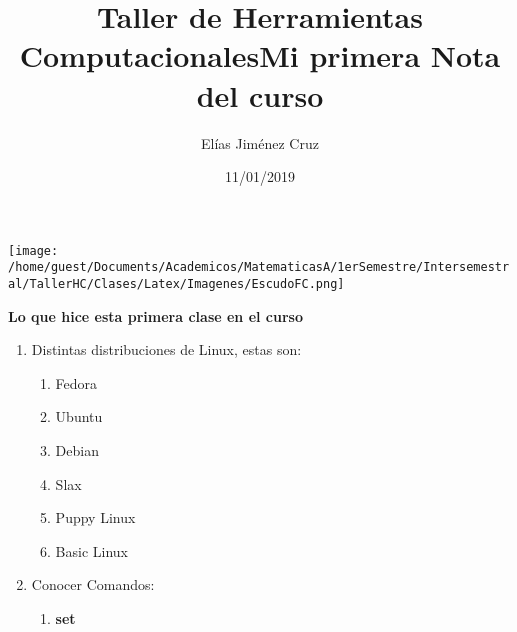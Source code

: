 \documentclass[letterpaper, 12pt, oneside]{article} %
\title{\Huge Taller de Herramientas Computacionales}
\author{Elías Jiménez Cruz}
\date{11/01/2019}
\begin{document}
	\maketitle
	\begin{center}
		\texttt{[image: /home/guest/Documents/Academicos/MatematicasA/1erSemestre/Intersemestral/TallerHC/Clases/Latex/Imagenes/EscudoFC.png]}
	\end{center}
	\newpage
	\title{\Huge Mi primera Nota del curso\\}
	\textbf{Lo que hice esta primera clase en el curso}
	\begin{enumerate}
		\item Distintas distribuciones de Linux, estas son:
		\begin{enumerate}
			\item Fedora
			\item Ubuntu
			\item Debian
			\item Slax
			\item Puppy Linux
			\item Basic Linux
		\end{enumerate}
		\item Conocer Comandos:
		\begin{enumerate}
			\item
			\color{magenta}\textbf{set}
		\end{enumerate}
	\end{enumerate}
\end{document}
